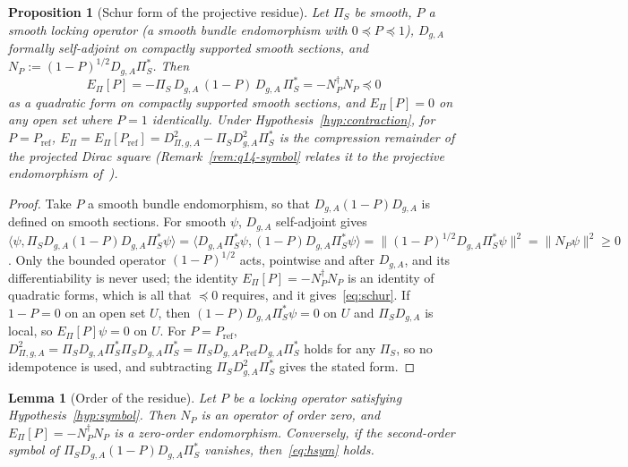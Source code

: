 \documentclass[11pt]{article}
\newtheorem{proposition}{Proposition}
\newtheorem{lemma}{Lemma}
\theoremstyle{definition}
\newcommand{\EPi}{E_\Pi}
\newcommand{\PiS}{\Pi_S}
\begin{document}
    \begin{proposition}[Schur form of the projective residue]
      \label{prop:schur}
      Let $\PiS$ be smooth, $P$ a smooth locking operator (a smooth bundle endomorphism with $0\preceq P\preceq1$), $D_{g,A}$ formally
      self-adjoint on compactly supported smooth sections, and $N_P:=(1-P)^{1/2}D_{g,A}\PiS^{*}$.
      Then
      \begin{equation}
        \label{eq:schur}
        \EPi[P]=-\PiS\,D_{g,A}\,(1-P)\,D_{g,A}\,\PiS^{*}=-N_P^{\dagger}N_P\preceq0
      \end{equation}
      as a quadratic form on compactly supported smooth sections, and $\EPi[P]=0$ on any open set where $P=1$ identically.
      Under Hypothesis~\ref{hyp:contraction}, for $P=P_{\mathrm{ref}}$, $\EPi=\EPi[P_{\mathrm{ref}}]=D^2_{\Pi,g,A}-\PiS
      D_{g,A}^2\PiS^{*}$ is the compression remainder of the projected Dirac square
      (Remark~\ref{rem:q14-symbol} relates it to the projective endomorphism of~\cite{Beau2026q14}).
    \end{proposition}

    \begin{proof}
      Take $P$ a smooth bundle endomorphism, so that $D_{g,A}(1-P)D_{g,A}$ is defined on smooth sections.
      For smooth $\psi$, $D_{g,A}$ self-adjoint gives
      $\langle\psi,\PiS D_{g,A}(1-P)D_{g,A}\PiS^{*}\psi\rangle=\langle D_{g,A}\PiS^{*}\psi,(1-P)D_{g,A}\PiS^{*}\psi\rangle
      =\|(1-P)^{1/2}D_{g,A}\PiS^{*}\psi\|^2=\|N_P\psi\|^2\ge0$.
      Only the bounded operator $(1-P)^{1/2}$ acts, pointwise and after $D_{g,A}$, and its differentiability is never
      used; the identity $\EPi[P]=-N_P^{\dagger}N_P$ is an identity of quadratic forms, which is all that $\preceq0$
      requires, and it gives~\eqref{eq:schur}.
      If $1-P=0$ on an open set $U$, then $(1-P)D_{g,A}\PiS^{*}\psi=0$ on $U$ and $\PiS D_{g,A}$ is local, so
      $\EPi[P]\psi=0$ on $U$.
      For $P=P_{\mathrm{ref}}$, $D^2_{\Pi,g,A}=\PiS D_{g,A}\PiS^{*}\PiS D_{g,A}\PiS^{*}=\PiS
      D_{g,A}P_{\mathrm{ref}}D_{g,A}
      \PiS^{*}$ holds for any $\PiS$, so no idempotence is used, and subtracting $\PiS D_{g,A}^2\PiS^{*}$ gives the
      stated form.
    \end{proof}

    \begin{lemma}[Order of the residue]
      \label{lem:order}
      Let $P$ be a locking operator satisfying Hypothesis~\ref{hyp:symbol}.
      Then $N_P$ is an operator of order zero, and $\EPi[P]=-N_P^{\dagger}N_P$ is a zero-order endomorphism.
      Conversely, if the second-order symbol of $\PiS D_{g,A}(1-P)D_{g,A}\PiS^{*}$ vanishes, then~\eqref{eq:hsym} holds.
    \end{lemma}
\end{document}
